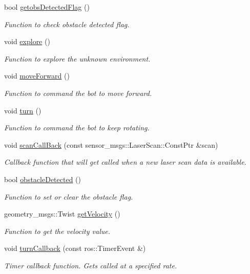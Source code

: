 \begin{DoxyCompactItemize}
bool \hyperlink{classNavigate_ac8788261266286b567d4c8cda8b8da91}{getobs\+Detected\+Flag} ()
\begin{DoxyCompactList}\small\item\em Function to check obstacle detected flag. \end{DoxyCompactList}\item 
void \hyperlink{classNavigate_a1e529a8e0a14d0a9537f446736014163}{explore} ()
\begin{DoxyCompactList}\small\item\em Function to explore the unknown environment. \end{DoxyCompactList}\item 
void \hyperlink{classNavigate_aaadf67ae524807fbfdaa8c5972e6c4dd}{move\+Forward} ()
\begin{DoxyCompactList}\small\item\em Function to command the bot to move forward. \end{DoxyCompactList}\item 
void \hyperlink{classNavigate_a10d11870d9f3a4a53dff0557e6abf266}{turn} ()
\begin{DoxyCompactList}\small\item\em Function to command the bot to keep rotating. \end{DoxyCompactList}\item 
void \hyperlink{classNavigate_a1a1857da4250c5fec16c14d9ac9506bc}{scan\+Call\+Back} (const sensor\+\_\+msgs\+::\+Laser\+Scan\+::\+Const\+Ptr \&scan)
\begin{DoxyCompactList}\small\item\em Callback function that will get called when a new laser scan data is available. \end{DoxyCompactList}\item 
bool \hyperlink{classNavigate_a1f62e5c7ea322422c3119f0f6cea540c}{obstacle\+Detected} ()
\begin{DoxyCompactList}\small\item\em Function to set or clear the obstacle flag. \end{DoxyCompactList}\item 
geometry\+\_\+msgs\+::\+Twist \hyperlink{classNavigate_a7dfcd82d5a92c144fb72a72b9dd115c2}{get\+Velocity} ()
\begin{DoxyCompactList}\small\item\em Function to get the velocity value. \end{DoxyCompactList}\item 
void \hyperlink{classNavigate_ac3aec357be1bb612cc75e63f61d154c1}{turn\+Callback} (const ros\+::\+Timer\+Event \&)
\begin{DoxyCompactList}\small\item\em Timer callback function. Gets called at a specified rate. \end{DoxyCompactList}\end{DoxyCompactItemize}


